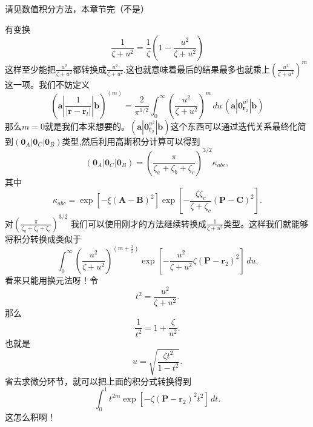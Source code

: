 \documentclass[12pt,a4paper,openany,twoside]{article}
\numberwithin{equation}{section}
\begin{document}
                请见数值积分方法，本章节完（不是）

                有变换
                \begin{equation}
                    \frac{1}{\zeta + u^2} = \frac{1}{\zeta} \left(1 - \frac{u^2}{\zeta + u^2}\right)
                \end{equation}
                这样至少能把$\frac{u^2}{\zeta+u^2}$都转换成$\frac{u^2}{\zeta+u^2}$.这也就意味着最后的结果最多也就乘上$(\frac{u^2}{\zeta+u^2})^m$这一项。我们不妨定义
                \begin{equation}
                    (\boldsymbol{a} | \frac{1}{|\boldsymbol{r} - \boldsymbol{r}_l|} |\boldsymbol{b} )^{(m)} = \frac{2}{\pi^{1 / 2}} \int_0^\infty \left(\frac{u^2}{\zeta+u^2}\right)^m\, du \, (\boldsymbol{a}|\boldsymbol{0}_{\boldsymbol{r}_2}^{u^2}|\boldsymbol{b})
                \end{equation}
                那么$m=0$就是我们本来想要的。$(\boldsymbol{a}|\boldsymbol{0}_{\boldsymbol{r}_2}^{u^2}|\boldsymbol{b})$这个东西可以通过迭代关系最终化简到$(\boldsymbol{0}_A|\boldsymbol{0}_C|\boldsymbol{0}_B)$类型,然后利用高斯积分计算可以得到
                \begin{equation}
                    \left(\boldsymbol{0}_{A}\left|\boldsymbol{0}_{C}\right| \boldsymbol{0}_{B}\right)=\left(\frac{\pi}{\zeta_{a}+\zeta_{b}+\zeta_{c}}\right)^{3 / 2} \kappa_{a b c},
                \end{equation}
                其中
                \begin{equation}
                    \kappa_{a b c}=\exp \left[-\xi(\boldsymbol{A}-\boldsymbol{B})^{2}\right] \exp \left[-\frac{\zeta \zeta_{c}}{\zeta+\zeta_{c}}(\boldsymbol{P}-\boldsymbol{C})^{2}\right].
                \end{equation}
                对$\left(\frac{\pi}{\zeta_{a}+\zeta_{b}+\zeta_{c}}\right)^{3 / 2}$ 我们可以使用刚才的方法继续转换成$\frac{1}{\zeta + u^2}$类型。这样我们就能够将积分转换成类似于
                \[
                    \int_0^\infty \left(\frac{u^2}{\zeta + u^2}\right)^{(m+\frac{3}{2})}\exp\left[-\frac{u^2}{\zeta + u^2} \zeta (\boldsymbol{P}-\boldsymbol{r}_2)^2\right]\, du.
                \]
                看来只能用换元法呀！令
                \begin{equation}
                    t^2 = \frac{u^2}{\zeta + u^2}.
                \end{equation}
                那么
                \begin{equation}
                    \frac{1}{t^2} = 1 + \frac{\zeta}{u^2}.
                \end{equation}
                也就是
                \begin{equation}
                    u = \sqrt{\frac{\zeta t^2}{1-t^2}}.
                \end{equation}
                省去求微分环节，就可以把上面的积分式转换得到
                \[
                    \int_0^1 t^{2m} \exp\left[-\zeta (\boldsymbol{P}-\boldsymbol{r}_2)^2t^2\right]\, dt.
                \]
                这怎么积啊！
\end{document}
